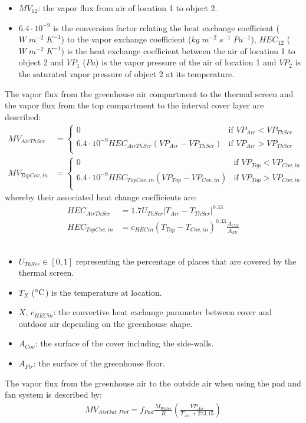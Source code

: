 \documentclass[a4paper]{article}
\numberwithin{equation}{section}
\begin{document}
\begin{itemize}
    \item \(MV_{12}\): the vapor flux from air of location 1 to object 2.
    \item \(6.4 \cdot 10^{-9}\) is the conversion factor relating the heat exchange coefficient (\(W\;m^{-2}\;K^{-1}\)) to the vapor exchange coefficient (\(kg\;m^{-2}\;s^{-1}\;Pa^{-1}\)), \(HEC_{12}\) (\(W\;m^{-2}\;K^{-1}\)) is the heat exchange coefficient between the air of location 1 to object 2 and \(VP_1\) (\(Pa\)) is the vapor pressure of the air of location 1 and \(VP_2\) is the saturated vapor pressure of object 2 at its temperature.
\end{itemize}
The vapor flux from the greenhouse air compartment to the thermal screen and the vapor flux from the top compartment to the interval cover layer are described:
\begin{align*}
  MV_{AirThScr}  & = \begin{cases}
    0                                                       & \text{if~} VP_{Air} < VP_{ThScr} \\
    6.4 \cdot 10^{-9} HEC_{AirThScr}(VP_{Air} - VP_{ThScr}) & \text{if~} VP_{Air} > VP_{ThScr} \\
  \end{cases} \\
  MV_{TopCov,in} & = \begin{cases}
    0                                                         & \text{if~} VP_{Top} < VP_{Cov,in} \\
    6.4 \cdot 10^{-9} HEC_{TopCov,in}(VP_{Top} - VP_{Cov,in}) & \text{if~} VP_{Top} > VP_{Cov,in} \\
  \end{cases}
\end{align*}
whereby their associated heat change coefficients are:
\begin{align*}
  HEC_{AirThScr}  & = 1.7 U_{ThScr} |T_{Air} - T_{ThScr}|^{0.33}                        \\
  HEC_{TopCov,in} & = {c_{HECin} (T_{Top} - T_{Cov,in})}^{0.33} \frac{A_{Cov}}{A_{Flr}}
\end{align*}\\
\begin{itemize}
    \item \(U_{ThScr} \in [0,1]\) representing the percentage of places that are covered by the thermal screen.
    \item \(T_X\) (\(\celsius\)) is the temperature at location.
    \item \(X\), \(c_{HECin}\): the convective heat exchange parameter between cover and outdoor air depending on the greenhouse shape.
    \item \(A_{Cov}\): the surface of the cover including the side-walls.
    \item \(A_{Flr}\): the surface of the greenhouse floor.
\end{itemize}
The vapor flux from the greenhouse air to the outside air when using the pad and fan system is described by:
\begin{align*}
  MV_{AirOut\_Pad} = f_{Pad} \frac{M_{Water}}{R} \left(\frac{VP_{Air}}{T_{Air} + 273.15}\right)
\end{align*}
\end{document}
